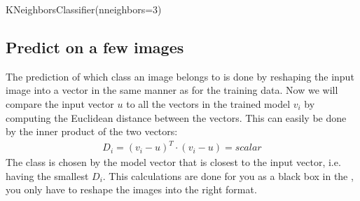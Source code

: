 \documentclass[letterpaper,10pt,english]{sphinxmanual}
\begin{document}
\begin{sphinxVerbatim}[commandchars=\\\{\}]
   
  

  
\PYG{p}{[}\PYG{p}{]}  \PYG{p}{[}\PYG{p}{]}
\end{sphinxVerbatim}

\begin{sphinxVerbatim}[commandchars=\\\{\}]
KNeighborsClassifier(n\PYGZus{}neighbors=3)
\end{sphinxVerbatim}


\subsection{Predict on a few images}
\label{\detokenize{03-Datasets:predict-on-a-few-images}}
\sphinxAtStartPar
The prediction of which class an image belongs to is done by reshaping the input image into a vector in the same manner as for the training data. Now we will compare the input vector \(u\) to all the vectors in the trained model \(v_i\) by computing the Euclidean distance between the vectors. This can easily be done by the inner product of the two vectors:
\begin{equation*}
\begin{split}D_i=(v_i-u)^T \cdot{} (v_i-u) = scalar\end{split}
\end{equation*}
\sphinxAtStartPar
The class is chosen by the model vector that is closest to the input vector, i.e. having the smallest \(D_i\). This calculations are done for you as a black box in the , you only have to reshape the images into the right format.

\begin{sphinxVerbatim}[commandchars=\\\{\}]
\PYG{p}{[}\PYG{p}{]} 
\end{sphinxVerbatim}
\end{document}
